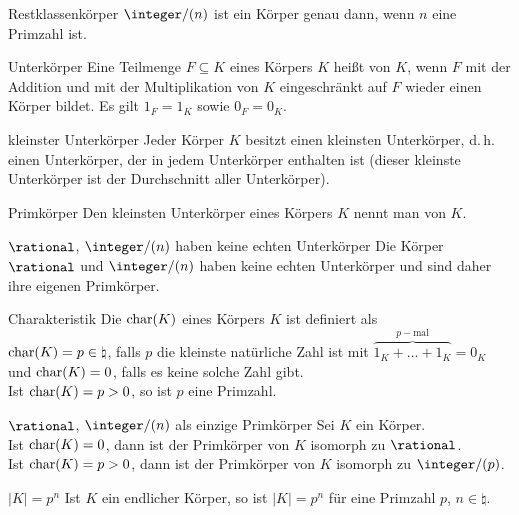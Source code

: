 \begin{Satz}{Restklassenkörper}
    $\integer/(n)$ ist ein Körper genau dann, wenn $n$ eine Primzahl ist.
\end{Satz}

\begin{Def}{Unterkörper}
    Eine Teilmenge $F \subseteq K$ eines Körpers $K$ heißt
     von $K$,
    wenn $F$ mit der Addition und mit der Multiplikation von $K$ eingeschränkt
    auf $F$ wieder einen Körper bildet.
    Es gilt $1_F = 1_K$ sowie $0_F = 0_K$.
\end{Def}

\begin{Lemma}{kleinster Unterkörper}
    Jeder Körper $K$ besitzt einen kleinsten Unterkörper, d.\,h. einen
    Unterkörper, der in jedem Unterkörper enthalten ist
    (dieser kleinste Unterkörper ist der Durchschnitt aller Unterkörper).
\end{Lemma}

\begin{Def}{Primkörper}
    Den kleinsten Unterkörper eines Körpers $K$ nennt man 
    von $K$.
\end{Def}

\begin{Lemma}{$\rational$, $\integer/(n)$ haben keine echten Unterkörper}
    Die Körper $\rational$ und $\integer/(n)$ haben keine echten Unterkörper
    und sind daher ihre eigenen Primkörper.
\end{Lemma}

\begin{Def}{Charakteristik}
    Die  $\operatorname{char}(K)$ eines Körpers $K$ ist definiert
    als \\
    $\operatorname{char}(K) = p \in \natural$, falls $p$ die kleinste natürliche Zahl
    ist mit $\overbrace{1_K + \ldots + 1_K}^{p-\text{mal}} = 0_K$ \\
    und $\operatorname{char}(K) = 0$, falls es keine solche Zahl gibt. \\
    Ist $\operatorname{char}(K) = p > 0$, so ist $p$ eine Primzahl.
\end{Def}

\begin{Satz}{$\rational$, $\integer/(n)$ als einzige Primkörper}
    Sei $K$ ein Körper. \\
    Ist $\operatorname{char}(K) = 0$, dann ist der Primkörper von $K$ isomorph zu
    $\rational$. \\
    Ist $\operatorname{char}(K) = p > 0$, dann ist der Primkörper von $K$ isomorph zu
    $\integer/(p)$.
\end{Satz}

\begin{Lemma}{$|K| = p^n$}
    Ist $K$ ein endlicher Körper, so ist $|K| = p^n$ für eine Primzahl
    $p$, $n \in \natural$.
\end{Lemma}

\pagebreak
